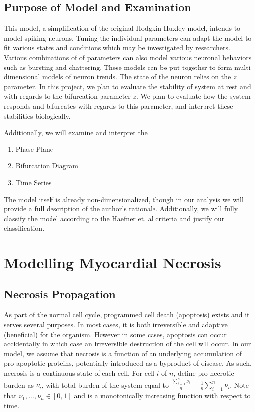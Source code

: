 \documentclass[11pt]{article}
\begin{document}
\subsection{Purpose of Model and Examination}

This model, a simplification of the original Hodgkin Huxley model, intends to model spiking neurons. Tuning the individual parameters can adapt the model to fit various states and conditions which may be investigated by researchers. Various combinations of of parameters can also model various neuronal behaviors such as bursting and chattering. These models can be put together to form multi dimensional models of neuron trends. The state of the neuron relies on the $z$ parameter. 
In this project, we plan to evaluate the stability of system at rest and with regards to the bifurcation parameter $z$. We plan to evaluate how the system responds and bifurcates with regards to this parameter, and interpret these stabilities biologically. %

Additionally, we will examine and interpret the 

\begin{enumerate}
	\item Phase Plane
	\item Bifurcation Diagram
	\item Time Series
\end{enumerate}

The model itself is already non-dimensionalized, though in our analysis we will provide a full description of the author's rationale. Additionally, we will fully classify the model according to the Haefner et. al criteria and justify our classification.


\section{Modelling Myocardial Necrosis} 
\subsection{Necrosis Propagation}

As part of the normal cell cycle, programmed cell death (apoptosis) exists and it serves several purposes. In most cases, it is both irreversible and adaptive (beneficial) for the organism. However in some cases, apoptosis can occur accidentally in which case an irreversible destruction of the cell will occur. In our model, we assume that necrosis is a function of an underlying accumulation of pro-apoptotic proteins, potentially introduced as a byproduct of disease. As such, necrosis is a continuous state of each cell. For cell $i$ of $n$, define pro-necrotic burden as $\nu_i$, with total burden of the system equal to $\frac{\sum^n_{i=1} \nu_i}{n}=\frac{1}{n} \sum^n_{i=1} \nu_i$. Note that $\nu_{1}, ..., \nu_{n} \in [0,1]$ and is a monotonically increasing function with respect to time. 
\end{document}
